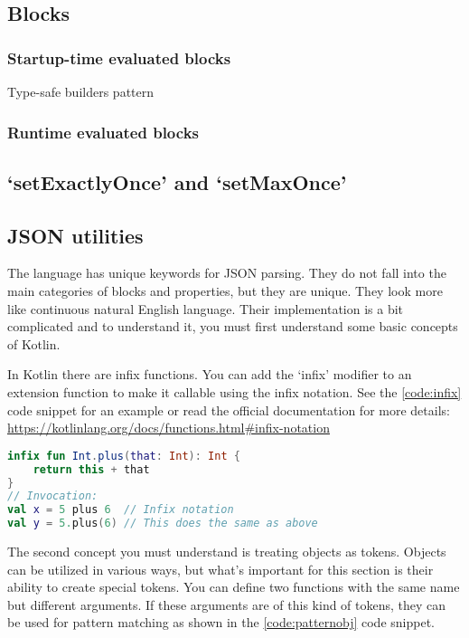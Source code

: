 \subsection{Blocks}

\subsubsection{Startup-time evaluated blocks}

Type-safe builders pattern

\subsubsection{Runtime evaluated blocks}

\subsection{`setExactlyOnce' and `setMaxOnce'}



\subsection{JSON utilities}

The language has unique keywords for JSON parsing. They do not fall into the main categories of blocks and properties, but they are unique. They look more like continuous natural English language. Their implementation is a bit complicated and to understand it, you must first understand some basic concepts of Kotlin.

In Kotlin there are infix functions. You can add the `infix' modifier to an extension function to make it callable using the infix notation. See the \ref{code:infix} code snippet for an example or read the official documentation for more details: \url{https://kotlinlang.org/docs/functions.html#infix-notation}

\begin{lstlisting}[caption={Infix functions},language=Kotlin,label=code:infix]
infix fun Int.plus(that: Int): Int {
    return this + that
}
// Invocation:
val x = 5 plus 6  // Infix notation
val y = 5.plus(6) // This does the same as above
\end{lstlisting}

The second concept you must understand is treating objects as tokens. Objects can be utilized in various ways, but what's important for this section is their ability to create special tokens. You can define two functions with the same name but different arguments. If these arguments are of this kind of tokens, they can be used for pattern matching as shown in the \ref{code:patternobj} code snippet.

